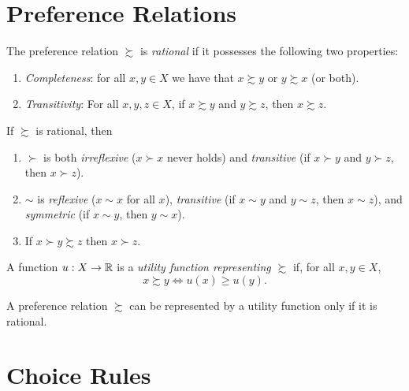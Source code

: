 \addtocounter{section}{1}

\section{Preference Relations}

\begin{defn}
    The preference relation $\succsim$ is \emph{rational} if it possesses the following two properties:
    \begin{enumerate}
        \item \emph{Completeness}: for all $x, y \in X$ we have that $x \succsim y$ or $y \succsim x$ (or both).
        \item \emph{Transitivity}: For all $x, y, z \in X$, if $x \succsim y$ and $y \succsim z$, then $x \succsim z$.
    \end{enumerate}
\end{defn}

\begin{prop}
    If $\succsim$ is rational, then 
    \begin{enumerate}
        \item $\succ$ is both \emph{irreflexive} ($x \succ x$ never holds) and \emph{transitive} (if $x \succ y$ and $y \succ z$, then $x \succ z$).
        \item $\sim$ is \emph{reflexive} ($x \sim x$ for all $x$), \emph{transitive} (if $x \sim y$ and $y \sim z$, then $x \sim z$), and \emph{symmetric} (if $x \sim y$, then $y \sim x$).
        \item If $x \succ y \succsim z$ then $x \succ z$.
    \end{enumerate}
\end{prop}

\begin{defn}
    A function $u: X \rightarrow \mathbb{R}$ is a \emph{utility function representing $\succsim$} if, for all $x, y \in X$,
    \begin{equation*}
        x \succsim y \iff u(x) \geq u(y).
    \end{equation*}
\end{defn}

\begin{prop}
    A preference relation $\succsim$ can be represented by a utility function only if it is rational.
\end{prop}

\section{Choice Rules}

